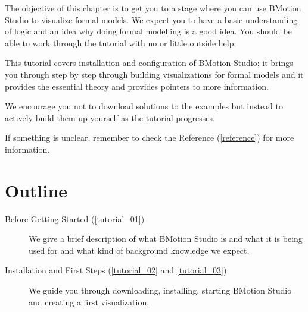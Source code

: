 
The objective of this chapter is to get you to a stage where you can use BMotion Studio to visualize formal models.  
We expect you to have a basic understanding of logic and an idea why doing formal modelling is a good idea.  
You should be able to work through the tutorial with no or little outside help.

This tutorial covers installation and configuration of BMotion Studio; it brings you through step by step through building visualizations for formal models and it provides the essential theory and provides pointers to more information.

We encourage you not to download solutions to the examples but instead to actively build them up yourself as the tutorial progresses.

If something is unclear, remember to check the Reference (\ref{reference}) for more information.

\section{Outline}

\begin{description}
	\item[Before Getting Started (\ref{tutorial_01})] We give a brief description of what BMotion Studio is and what it is being used for and what kind of background knowledge we expect.
	\item[Installation and First Steps (\ref{tutorial_02} and \ref{tutorial_03})] We guide you through downloading, installing, starting BMotion Studio and creating a first visualization.
	
\end{description}
